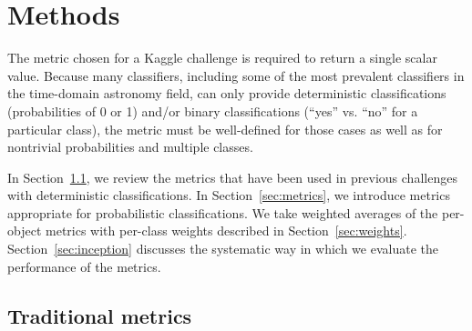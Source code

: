 \section{Methods}
\label{sec:methods}


The metric chosen for a Kaggle challenge is required to return a single scalar value.
Because many classifiers, including some of the most prevalent classifiers in the time-domain astronomy field, can only provide deterministic classifications (probabilities of 0 or 1) and/or binary classifications (``yes'' vs. ``no'' for a particular class), the metric must be well-defined for those cases as well as for nontrivial probabilities and multiple classes.

In Section~\ref{sec:past}, we review the metrics that have been used in previous challenges with deterministic classifications.
In Section~\ref{sec:metrics}, we introduce metrics appropriate for probabilistic classifications.
We take weighted averages of the per-object metrics with per-class weights described in Section~\ref{sec:weights}.
Section~\ref{sec:inception} discusses the systematic way in which we evaluate the performance of the metrics.

\subsection{Traditional metrics}
\label{sec:past}

